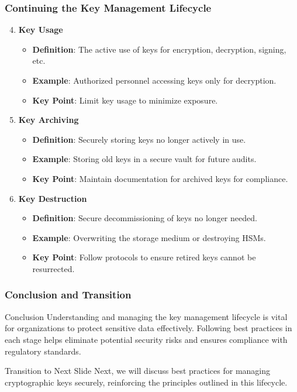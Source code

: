 \documentclass{beamer}
\begin{document}
\begin{frame}[fragile]
    \frametitle{Continuing the Key Management Lifecycle}
    \begin{enumerate}
        \setcounter{enumi}{3}
        \item \textbf{Key Usage}
            \begin{itemize}
                \item \textbf{Definition}: The active use of keys for encryption, decryption, signing, etc.
                \item \textbf{Example}: Authorized personnel accessing keys only for decryption.
                \item \textbf{Key Point}: Limit key usage to minimize exposure.

            \end{itemize}

        \item \textbf{Key Archiving}
            \begin{itemize}
                \item \textbf{Definition}: Securely storing keys no longer actively in use.
                \item \textbf{Example}: Storing old keys in a secure vault for future audits.
                \item \textbf{Key Point}: Maintain documentation for archived keys for compliance.
            \end{itemize}

        \item \textbf{Key Destruction}
            \begin{itemize}
                \item \textbf{Definition}: Secure decommissioning of keys no longer needed.
                \item \textbf{Example}: Overwriting the storage medium or destroying HSMs.
                \item \textbf{Key Point}: Follow protocols to ensure retired keys cannot be resurrected.
            \end{itemize}
    \end{enumerate}
\end{frame}

\begin{frame}[fragile]
    \frametitle{Conclusion and Transition}
    \begin{block}{Conclusion}
        Understanding and managing the key management lifecycle is vital for organizations to protect sensitive data effectively. Following best practices in each stage helps eliminate potential security risks and ensures compliance with regulatory standards.
    \end{block}

    \begin{block}{Transition to Next Slide}
        Next, we will discuss best practices for managing cryptographic keys securely, reinforcing the principles outlined in this lifecycle.
    \end{block}
\end{frame}
\end{document}
